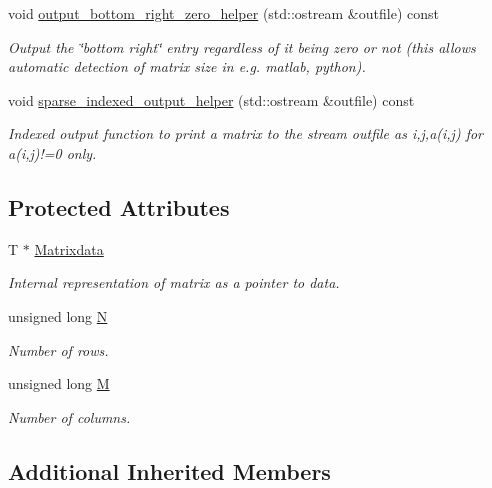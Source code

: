 \begin{DoxyCompactItemize}
void \hyperlink{classoomph_1_1DenseMatrix_aa02dc7c9b2f4e1cc1204cc8281f030f9}{output\+\_\+bottom\+\_\+right\+\_\+zero\+\_\+helper} (std\+::ostream \&outfile) const
\begin{DoxyCompactList}\small\item\em Output the \char`\"{}bottom right\char`\"{} entry regardless of it being zero or not (this allows automatic detection of matrix size in e.\+g. matlab, python). \end{DoxyCompactList}\item 
void \hyperlink{classoomph_1_1DenseMatrix_a6e9084acc11e036d4c5f7e5322d12034}{sparse\+\_\+indexed\+\_\+output\+\_\+helper} (std\+::ostream \&outfile) const
\begin{DoxyCompactList}\small\item\em Indexed output function to print a matrix to the stream outfile as i,j,a(i,j) for a(i,j)!=0 only. \end{DoxyCompactList}\end{DoxyCompactItemize}
\subsection*{Protected Attributes}
\begin{DoxyCompactItemize}
\item 
T $\ast$ \hyperlink{classoomph_1_1DenseMatrix_a92a2eea603a42e22fd4d3ea0a258e6f8}{Matrixdata}
\begin{DoxyCompactList}\small\item\em Internal representation of matrix as a pointer to data. \end{DoxyCompactList}\item 
unsigned long \hyperlink{classoomph_1_1DenseMatrix_a23cb539be0b4ef0381b9f18e8e50f75e}{N}
\begin{DoxyCompactList}\small\item\em Number of rows. \end{DoxyCompactList}\item 
unsigned long \hyperlink{classoomph_1_1DenseMatrix_aa36631ee95fe55afe697377b03d05d6a}{M}
\begin{DoxyCompactList}\small\item\em Number of columns. \end{DoxyCompactList}\end{DoxyCompactItemize}
\subsection*{Additional Inherited Members}


